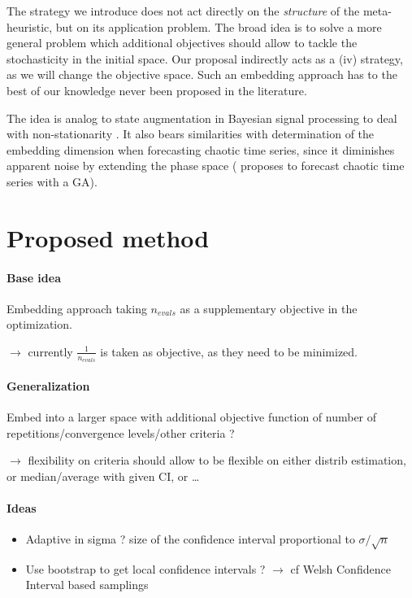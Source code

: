 The strategy we introduce does not act directly on the \emph{structure} of the meta-heuristic, but on its application problem. The broad idea is to solve a more general problem which additional objectives should allow to tackle the stochasticity in the initial space. Our proposal indirectly acts as a (iv) strategy, as we will change the objective space. Such an embedding approach has to the best of our knowledge never been proposed in the literature.

The idea is analog to state augmentation in Bayesian signal processing to deal with non-stationarity \cite{simon2006optimal}. It also bears similarities with determination of the embedding dimension when forecasting chaotic time series, since it diminishes apparent noise by extending the phase space (\cite{szpiro1997forecasting} proposes to forecast chaotic time series with a GA).

\section{Proposed method}

\paragraph{Base idea}

Embedding approach taking $n_{evals}$ as a supplementary objective in the optimization.

$\rightarrow$ currently $\frac{1}{n_{evals}}$ is taken as objective, as they need to be minimized.

\paragraph{Generalization}


Embed into a larger space with additional objective function of number of repetitions/convergence levels/other criteria ?

$\rightarrow$ flexibility on criteria should allow to be flexible on either distrib estimation, or median/average with given CI, or \ldots



\paragraph{Ideas}

\begin{itemize}
\item Adaptive in sigma ? size of the confidence interval proportional to $\sigma / \sqrt{n}$
\item Use bootstrap to get local confidence intervals ? $\rightarrow$ cf Welsh Confidence Interval based samplings
\end{itemize}





